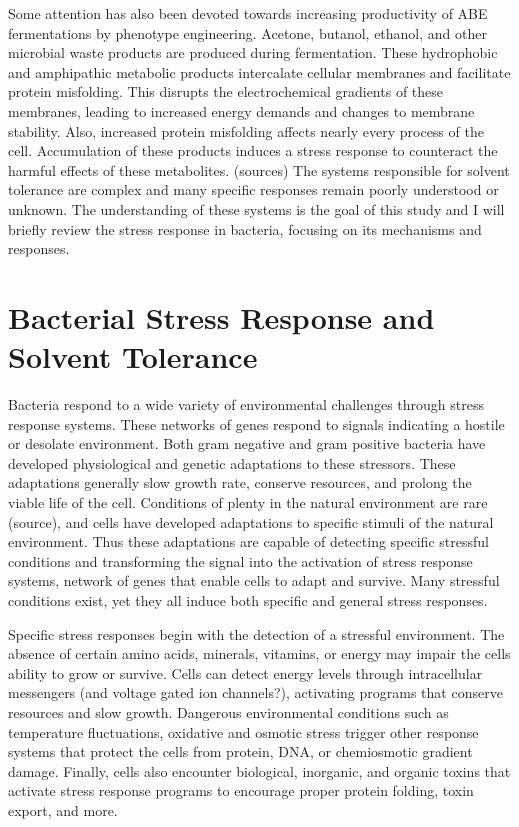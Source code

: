 Some attention has also been devoted towards increasing productivity of ABE fermentations by phenotype engineering. Acetone, butanol, ethanol, and other microbial waste products are produced during fermentation. These hydrophobic and amphipathic metabolic products intercalate cellular membranes and facilitate protein misfolding. This disrupts the electrochemical gradients of these membranes, leading to increased energy demands and changes to membrane stability. Also, increased protein misfolding affects nearly every process of the cell. Accumulation of these products induces a stress response to counteract the harmful effects of these metabolites. (sources) The systems responsible for solvent tolerance are complex and many specific responses remain poorly understood or unknown. The understanding of these systems is the goal of this study and I will briefly review the stress response in bacteria, focusing on its mechanisms and responses.

\section{Bacterial Stress Response and Solvent Tolerance}

Bacteria respond to a wide variety of environmental challenges through stress response systems. These networks of genes respond to signals indicating a hostile or desolate environment. Both gram negative and gram positive bacteria have developed physiological and genetic adaptations to these stressors. These adaptations generally slow growth rate, conserve resources, and prolong the viable life of the cell. Conditions of plenty in the natural environment are rare (source), and cells have developed adaptations to specific stimuli of the natural environment. Thus these adaptations are capable of detecting specific stressful conditions and transforming the signal into the activation of stress response systems, network of genes that enable cells to adapt and survive. Many stressful conditions exist, yet they all induce both specific and general stress responses.

Specific stress responses begin with the detection of a stressful environment. The absence of certain amino acids, minerals, vitamins, or energy may impair the cells ability to grow or survive. Cells can detect energy levels through intracellular messengers (and voltage gated ion channels?), activating programs that conserve resources and slow growth. Dangerous environmental conditions such as temperature fluctuations, oxidative and osmotic stress trigger other response systems that protect the cells from protein, DNA, or chemiosmotic gradient damage. Finally, cells also encounter biological, inorganic, and organic toxins that activate stress response programs to encourage proper protein folding, toxin export, and more. 

